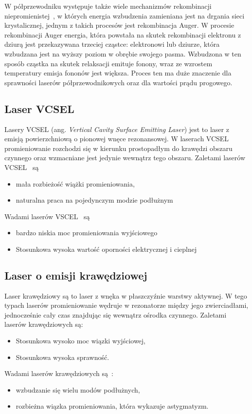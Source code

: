 W półprzewodniku występuje także wiele mechanizmów rekombinacji niepromienistej~\cite{praca_dok}, w których energia wzbudzenia zamieniana
jest na drgania sieci krystalicznej, jednym z takich procesów jest rekombinacja Auger. W procesie rekombinacji Auger energia, która
powstała na skutek rekombinacji elektronu z dziurą jest przekazywana trzeciej cząstce: elektronowi lub dziurze, która wzbudzana jest
na wyższy poziom w obrębie swojego pasma. Wzbudzona w ten sposób cząstka na skutek relaksacji emituje fonony, wraz ze wzrostem temperatury
emisja fononów jest większa. Proces ten ma duże znaczenie dla sprawności laserów półprzewodnikowych oraz dla wartości prądu progowego.

\subsection{Laser VCSEL}
Lasery VCSEL (ang. \textit{Vertical Cavity Surface Emitting Laser}) jest to laser z emisją powierzchniową o pionowej wnęce rezonansowej.
W laserach VCSEL promieniowanie rozchodzi się w kierunku prostopadłym do krawędzi obszaru czynnego oraz wzmacniane jest jedynie
wewnątrz tego obszaru\cite{publikcja_nakwaski}. Zaletami laserów VCSEL~\cite{publikcja_nakwaski} są
\begin{itemize}
\item mała rozbieżość wiążki promieniowania,
\item naturalna praca na pojedynczym modzie podłużnym
\end{itemize}
Wadami laserów VSCEL~\cite{publikcja_nakwaski} są
\begin{itemize}
\item bardzo niskia moc promieniowania wyjściowego
\item Stosunkowa wysoka wartość oporności elektrycznej i cieplnej
\end{itemize}
\subsection{Laser o emisji krawędziowej}
Laser krawędziowy są to laser z wnęka w płaszczyźnie warstwy aktywnej. W tego typach laserów promieniowanie wędruje w rezonatorze między
jego zwierciadłami, jednocześnie cały czas znajdując się wewnątrz ośrodka czynnego. Zaletami laserów krawędziowych są:
\begin{itemize}
\item Stosunkowa wysoko moc wiązki wyjściowej\cite{publikcja_nakwaski},
\item Stosunkowa wysoka sprawność.
\end{itemize}
Wadami laserów krawędziowych są~\cite{publikcja_nakwaski}:
\begin{itemize}
\item wzbudzanie się wielu modów podłużnych,
\item rozbieżna wiązka promieniowania, która wykazuje astygmatyzm.
\end{itemize}
